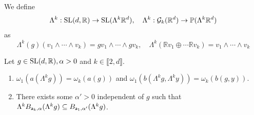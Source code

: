 \documentclass{report}
\begin{document}
\begin{definition}
    We define
    \[
    \Lambda^k : \operatorname{{\mathrm{SL}}}(d, \mathbb R) \to \operatorname{{\mathrm{SL}}}(\Lambda^k \mathbb R^d), \quad
    \Lambda^k : \mathcal G_k(\mathbb R^d) \to \mathbb P(\Lambda^k \mathbb R^d)
    \]
    as
    \[
    \Lambda^k(g)(v_1 \wedge \cdots \wedge v_k) = g v_1 \wedge \cdots \wedge g v_k,\quad
    \Lambda^k(\mathbb R v_1 \oplus \cdots \mathbb R v_k) =  v_1 \wedge \cdots \wedge v_k
    \]
\end{definition}
\begin{lemma}
    Let $g \in \operatorname{{\mathrm{SL}}}(d, \mathbb R), \alpha > 0$ and $k \in \llbracket 2, d \rrbracket$.
    \begin{enumerate}[label=(\roman*)]
        \item $\omega_1(a(\Lambda^k g)) = \omega_k(a(g))$ and $\omega_1(b(\Lambda^k g, \Lambda^k y)) = \omega_k(b(g, y))$.
        \item There exists some $\alpha' > 0$ independent of $g$ such that $\Lambda^k B_{{\sf a}_k, \alpha}(\Lambda^k g) \subseteq B_{{\sf a}_1, \alpha'}(\Lambda^k g)$.
    \end{enumerate}
\end{lemma}
\end{document}
